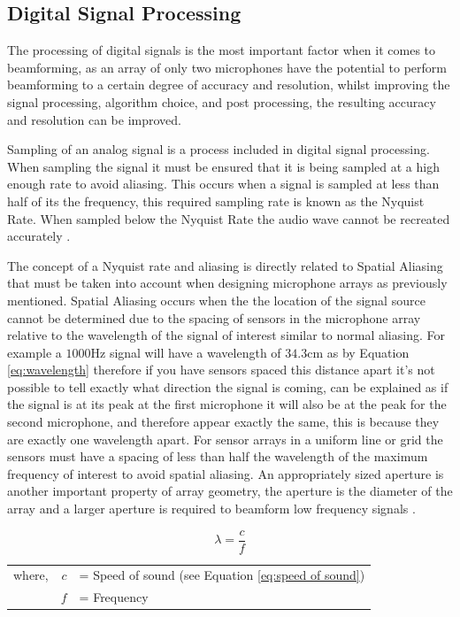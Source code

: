 \documentclass{UoNMCHA}
\numberwithin{equation}{section}
\begin{document}
\subsection{Digital Signal Processing} \label{sec:Signal Processing}
    The processing of digital signals is the most important factor when it comes to beamforming, as an array of only two microphones have the potential to perform beamforming to a certain degree of accuracy and resolution, whilst improving the signal processing, algorithm choice, and post processing, the resulting accuracy and resolution can be improved.
    
    Sampling of an analog signal is a process included in digital signal processing. When sampling the signal it must be ensured that it is being sampled at a high enough rate to avoid aliasing. This occurs when a signal is sampled at less than half of its the frequency, this required sampling rate is known as the Nyquist Rate. When sampled below the Nyquist Rate the audio wave cannot be recreated accurately \citep{Ben08}.
    
    The concept of a Nyquist rate and aliasing is directly related to Spatial Aliasing that must be taken into account when designing microphone arrays as previously mentioned. Spatial Aliasing occurs when the the location of the signal source cannot be determined due to the spacing of sensors in the microphone array relative to the wavelength of the signal of interest similar to normal aliasing. For example a $1000$Hz signal will have a wavelength of $34.3$cm as by Equation \ref{eq:wavelength} therefore if you have sensors spaced this distance apart it's not possible to tell exactly what direction the signal is coming, can be explained as if the signal is at its peak at the first microphone it will also be at the peak for the second microphone, and therefore appear exactly the same, this is because they are exactly one wavelength apart. For sensor arrays in a uniform line or grid the sensors must have a spacing of less than half the wavelength of the maximum frequency of interest to avoid spatial aliasing. An appropriately sized aperture is another important property of array geometry, the aperture is the diameter of the array and a larger aperture is required to beamform low frequency signals \citep{Ami08}.
	
	\begin{equation}
		\lambda = \frac{c}{f}
		\label{eq:wavelength}
	\end{equation}
	\begin{table}[H]
    \centering
        \begin{tabular}{lrl}
            where, & $c$ &= Speed of sound (see Equation \ref{eq:speed of sound}) \\
             & $f$ &= Frequency 
        \end{tabular}
    \end{table}
    
\end{document}
